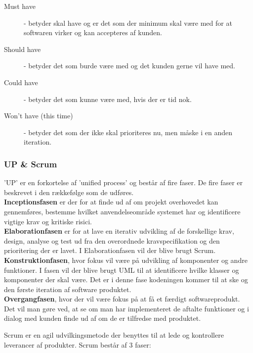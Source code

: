 \begin{description}
    \item [Must have] - betyder skal have og er det som der minimum skal være med for at softwaren virker og kan accepteres af kunden. 
    \item [Should have] - betyder det som burde være med og det kunden gerne vil have med.
    \item [Could have] - betyder det som kunne være med, hvis der er tid nok. 
    \item [Won't have (this time)] - betyder det som der ikke skal prioriteres nu, men måske i en anden iteration.
\end{description}


\subsubsection{UP \& Scrum}{\label{subsubsection: up_scrum}}

'UP' er en forkortelse af 'unified process' og består af fire faser. De fire faser er beskrevet i den rækkefølge som de udføres. \\


\textbf{Inceptionsfasen} er der for at finde ud af om projekt overhovedet kan gennemføres, bestemme hvilket anvendelseområde systemet har og identificere vigtige krav og kritiske risici. \\


\textbf{Elaborationfasen} er for at lave en iterativ udvikling af de forskellige krav, design, analyse og test ud fra den overordnede kravspecifikation og den prioritering der er lavet. I Elaborationfasen vil der blive brugt Scrum. \\


\textbf{Konstruktionfasen}, hvor fokus vil være på udvikling af komponenter og andre funktioner.
I fasen vil der blive brugt UML til at identificere hvilke klasser og komponenter der skal være. Det er i denne fase kodeningen kommer til at ske og den første iteration af software produktet.  \\


\textbf{Overgangfasen}, hvor der vil være fokus på at få et færdigt softwareprodukt.
Det vil man gøre ved, at se om man har implementeret de aftalte funktioner og i dialog med kunden finde ud af om de er tilfredse med produktet.

Scrum er en agil udvilkingsmetode der benyttes til at lede og kontrollere leverancer af produkter. Scrum består af 3 faser: 

